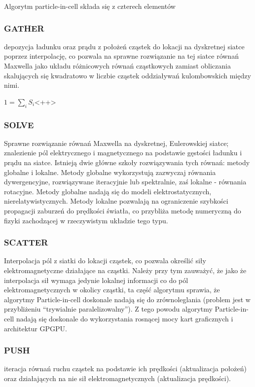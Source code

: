 Algorytm particle-in-cell składa się z czterech elementów %
\subsubsection{GATHER}
        depozycja ładunku oraz prądu z położeń cząstek do lokacji na dyskretnej siatce poprzez interpolację,
        co pozwala na sprawne rozwiązanie na tej siatce
        równań Maxwella jako układu różnicowych równań cząstkowych zamiast obliczania skalujących się kwadratowo w liczbie cząstek
        oddziaływań kulombowskich między nimi.

        $1 = \sum_i S_i$<++> %
\subsubsection{SOLVE}
        Sprawne rozwiązanie równań Maxwella na dyskretnej, Eulerowskiej siatce;
        znalezienie pól elektrycznego i magnetycznego
        na podstawie gęstości ładunku i prądu na siatce.
        Istnieją dwie główne szkoły rozwiązywania tych równań: metody globalne i lokalne. Metody globalne wykorzystują
        zazwyczaj równania dywergencyjne, rozwiązywane iteracyjnie lub spektralnie,
        zaś lokalne - równania rotacyjne. Metody globalne nadają się do modeli elektrostatycznych, nierelatywistycznych.
        Metody lokalne pozwalają na ograniczenie szybkości propagacji zaburzeń do prędkości światła, co przybliża
        metodę numeryczną do fizyki zachodzącej w rzeczywistym układzie tego typu.
\subsubsection{SCATTER}
        Interpolacja pól z siatki do lokacji cząstek, co pozwala określić siły elektromagnetyczne działające na cząstki.
        Należy przy tym zauważyć, że jako że interpolacja sił wymaga jedynie lokalnej informacji co do pól 
        elektromagnetycznych w okolicy cząstki, ta część algorytmu sprawia, że algorytmy Particle-in-cell doskonale
        nadają się do zrównoleglania (problem jest w przybliżeniu ``trywialnie paralelizowalny''). Z tego powodu algorytmy
        Particle-in-cell nadają się doskonale do wykorzystania rosnącej mocy kart graficznych i architektur GPGPU.
\subsubsection{PUSH}
        iteracja równań ruchu cząstek na podstawie ich prędkości (aktualizacja położeń)
        oraz działających na nie sił elektromagnetycznych (aktualizacja prędkości).

